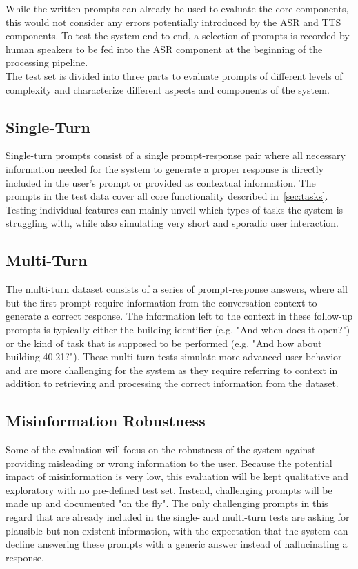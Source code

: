 \documentclass{article}
\begin{document}
While the written prompts can already be used to evaluate the core components, this would not consider any errors potentially introduced by the ASR and TTS components. To test the system end-to-end, a selection of prompts is recorded by human speakers to be fed into the ASR component at the beginning of the processing pipeline.\\

The test set is divided into three parts to evaluate prompts of different levels of complexity and characterize different aspects and components of the system.

\subsection{Single-Turn}
Single-turn prompts consist of a single prompt-response pair where all necessary information needed for the system to generate a proper response is directly included in the user's prompt or provided as contextual information. The prompts in the test data cover all core functionality described in~\cref{sec:tasks}. Testing individual features can mainly unveil which types of tasks the system is struggling with, while also simulating very short and sporadic user interaction.

\subsection{Multi-Turn}
The multi-turn dataset consists of a series of prompt-response answers, where all but the first prompt require information from the conversation context to generate a correct response. The information left to the context in these follow-up prompts is typically either the building identifier (e.g. "And when does it open?") or the kind of task that is supposed to be performed (e.g. "And how about building 40.21?"). These multi-turn tests simulate more advanced user behavior and are more challenging for the system as they require referring to context in addition to retrieving and processing the correct information from the dataset.

\subsection{Misinformation Robustness}
Some of the evaluation will focus on the robustness of the system against providing misleading or wrong information to the user. Because the potential impact of misinformation is very low, this evaluation will be kept qualitative and exploratory with no pre-defined test set. Instead, challenging prompts will be made up and documented "on the fly". The only challenging prompts in this regard that are already included in the single- and multi-turn tests are asking for plausible but non-existent information, with the expectation that the system can decline answering these prompts with a generic answer instead of hallucinating a response.\\
\end{document}
